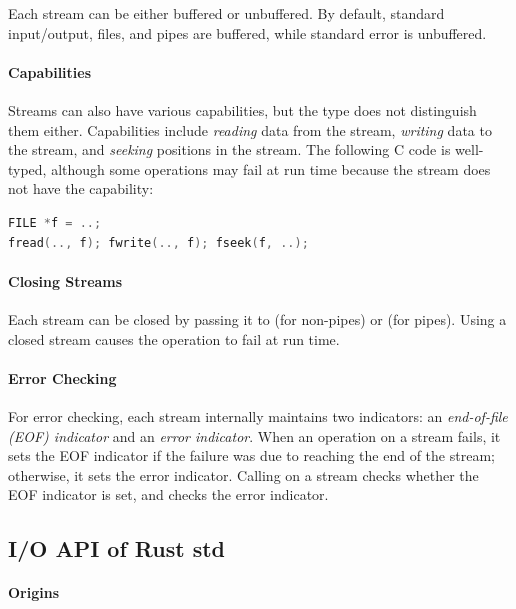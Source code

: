 Each stream can be either buffered or unbuffered.
%
By default, standard input/output, files, and pipes are buffered, while standard
error is unbuffered.

\paragraph{Capabilities}

Streams can also have various capabilities, but the type does not distinguish
them either.
%
Capabilities include \emph{reading} data from the stream, \emph{writing} data to
the stream, and \emph{seeking} positions in the stream.
%
The following C code is well-typed, although some operations may fail at run
time because the stream does not have the capability:

\begin{lstlisting}[language=C]
FILE *f = ..;
fread(.., f); fwrite(.., f); fseek(f, ..);
\end{lstlisting}

\paragraph{Closing Streams}

Each stream can be closed by passing it to  (for non-pipes) or
 (for pipes).
%
Using a closed stream causes the operation to fail at run time.

\paragraph{Error Checking}

For error checking, each stream internally maintains two indicators:
%
an \emph{end-of-file (EOF) indicator} and an \emph{error indicator}.
%
When an operation on a stream fails, it sets the EOF indicator if the failure
was due to reaching the end of the stream; otherwise, it sets the error
indicator.
%
Calling  on a stream checks whether the EOF indicator is set, and
 checks the error indicator.

\subsection{I/O API of Rust std}
\label{sec:background:rust}

\paragraph{Origins}

